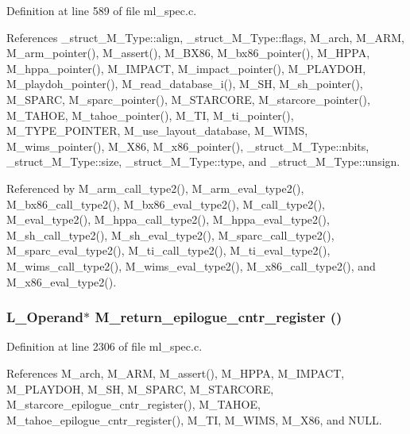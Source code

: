 Definition at line 589 of file ml\_\-spec.c.

References \_\-struct\_\-M\_\-Type::align, \_\-struct\_\-M\_\-Type::flags, M\_\-arch, M\_\-ARM, M\_\-arm\_\-pointer(), M\_\-assert(), M\_\-BX86, M\_\-bx86\_\-pointer(), M\_\-HPPA, M\_\-hppa\_\-pointer(), M\_\-IMPACT, M\_\-impact\_\-pointer(), M\_\-PLAYDOH, M\_\-playdoh\_\-pointer(), M\_\-read\_\-database\_\-i(), M\_\-SH, M\_\-sh\_\-pointer(), M\_\-SPARC, M\_\-sparc\_\-pointer(), M\_\-STARCORE, M\_\-starcore\_\-pointer(), M\_\-TAHOE, M\_\-tahoe\_\-pointer(), M\_\-TI, M\_\-ti\_\-pointer(), M\_\-TYPE\_\-POINTER, M\_\-use\_\-layout\_\-database, M\_\-WIMS, M\_\-wims\_\-pointer(), M\_\-X86, M\_\-x86\_\-pointer(), \_\-struct\_\-M\_\-Type::nbits, \_\-struct\_\-M\_\-Type::size, \_\-struct\_\-M\_\-Type::type, and \_\-struct\_\-M\_\-Type::unsign.

Referenced by M\_\-arm\_\-call\_\-type2(), M\_\-arm\_\-eval\_\-type2(), M\_\-bx86\_\-call\_\-type2(), M\_\-bx86\_\-eval\_\-type2(), M\_\-call\_\-type2(), M\_\-eval\_\-type2(), M\_\-hppa\_\-call\_\-type2(), M\_\-hppa\_\-eval\_\-type2(), M\_\-sh\_\-call\_\-type2(), M\_\-sh\_\-eval\_\-type2(), M\_\-sparc\_\-call\_\-type2(), M\_\-sparc\_\-eval\_\-type2(), M\_\-ti\_\-call\_\-type2(), M\_\-ti\_\-eval\_\-type2(), M\_\-wims\_\-call\_\-type2(), M\_\-wims\_\-eval\_\-type2(), M\_\-x86\_\-call\_\-type2(), and M\_\-x86\_\-eval\_\-type2().
\subsubsection{\setlength{\rightskip}{0pt plus 5cm}L\_\-Operand$\ast$ M\_\-return\_\-epilogue\_\-cntr\_\-register ()}\label{ml__spec_8c_462adaf13d377690c81f298e03f04687}




Definition at line 2306 of file ml\_\-spec.c.

References M\_\-arch, M\_\-ARM, M\_\-assert(), M\_\-HPPA, M\_\-IMPACT, M\_\-PLAYDOH, M\_\-SH, M\_\-SPARC, M\_\-STARCORE, M\_\-starcore\_\-epilogue\_\-cntr\_\-register(), M\_\-TAHOE, M\_\-tahoe\_\-epilogue\_\-cntr\_\-register(), M\_\-TI, M\_\-WIMS, M\_\-X86, and NULL.
